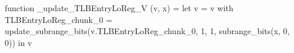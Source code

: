 function _update_TLBEntryLoReg_V (v, x) = let v = { v with TLBEntryLoReg_chunk_0 = update_subrange_bits(v.TLBEntryLoReg_chunk_0, 1, 1, subrange_bits(x, 0, 0)) } in
  v
